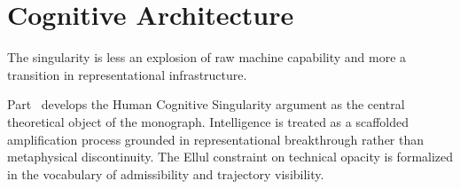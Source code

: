\part{Cognitive Architecture}
\label{part:cognitive}

\epigraph{The singularity is less an explosion of raw machine capability and more a
transition in representational infrastructure.}{}

\noindent Part~\ref{part:cognitive} develops the Human Cognitive Singularity argument
as the central theoretical object of the monograph. Intelligence is treated as a
scaffolded amplification process grounded in representational breakthrough rather than
metaphysical discontinuity. The Ellul constraint on technical opacity is formalized
in the vocabulary of admissibility and trajectory visibility.
\cleardoublepage
